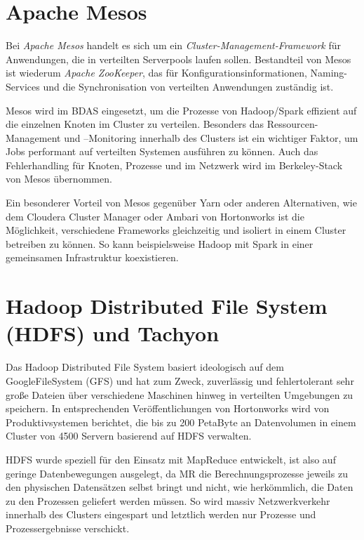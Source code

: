 \section{Apache Mesos}
\label{section:apache Mesos}


Bei \textit{Apache Mesos} handelt es sich um ein \textit{Cluster-Management-Framework} für Anwendungen, die in verteilten Serverpools laufen sollen. Bestandteil von Mesos ist wiederum \textit{Apache ZooKeeper}, das für Konfigurationsinformationen, Naming-Services und die Synchronisation von verteilten Anwendungen zuständig ist.  

Mesos wird im BDAS eingesetzt, um die Prozesse von Hadoop/Spark effizient auf die einzelnen Knoten im Cluster zu verteilen. Besonders das Ressourcen-Management und –Monitoring innerhalb des Clusters ist ein wichtiger Faktor, um Jobs performant auf verteilten Systemen ausführen zu können. Auch das Fehlerhandling für Knoten, Prozesse und im Netzwerk wird im Berkeley-Stack von Mesos übernommen. 

Ein besonderer Vorteil von Mesos gegenüber Yarn oder anderen Alternativen, wie dem Cloudera Cluster Manager oder Ambari von Hortonworks ist die Möglichkeit, verschiedene Frameworks gleichzeitig und isoliert in einem Cluster betreiben zu können. So kann beispielsweise Hadoop mit Spark in einer gemeinsamen Infrastruktur koexistieren.   
	
\section{Hadoop Distributed File System (HDFS) und Tachyon}
\label{section:hadoop Distributed File System (HDFS) und Tachyon}


Das Hadoop Distributed File System basiert ideologisch auf dem GoogleFileSystem (GFS) und hat zum Zweck, zuverlässig und fehlertolerant sehr große Dateien über verschiedene Maschinen hinweg in verteilten Umgebungen zu speichern. In entsprechenden Veröffentlichungen von Hortonworks  wird von Produktivsystemen berichtet, die bis zu 200 PetaByte an Datenvolumen in einem Cluster von 4500 Servern basierend auf HDFS verwalten.

HDFS wurde speziell für den Einsatz mit MapReduce entwickelt, ist also auf geringe Datenbewegungen ausgelegt, da MR die Berechnungsprozesse jeweils zu den physischen Datensätzen selbst bringt und nicht, wie herkömmlich, die Daten zu den Prozessen geliefert werden müssen. So wird massiv Netzwerkverkehr innerhalb des Clusters eingespart und letztlich werden nur Prozesse und Prozessergebnisse verschickt.  

